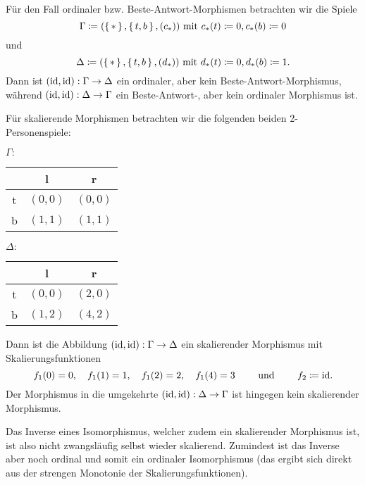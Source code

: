 \begin{bsp}
	Für den Fall ordinaler bzw. Beste-Antwort-Morphismen betrachten wir die Spiele 
		\[\Gamma \coloneqq (\set{\ast}, \set{t, b}, (c_\ast)) \text{ mit } c_\ast(t) \coloneqq 0, c_\ast(b) \coloneqq 0\]
	und 
		\[\Delta \coloneqq (\set{\ast}, \set{t, b}, (d_\ast)) \text{ mit } d_\ast(t) \coloneqq 0, d_\ast(b) \coloneqq 1.\]
	Dann ist $(\mathrm{id}, \mathrm{id}): \Gamma \to \Delta$ ein ordinaler, aber kein Beste-Antwort-Morphismus, während $(\mathrm{id}, \mathrm{id}): \Delta \to \Gamma$  ein Beste-Antwort-, aber kein ordinaler Morphismus ist.
\end{bsp}

\begin{bsp}\label{bsp:GegenbspSkalUndIsoIstSkalIso}
	Für skalierende Morphismen betrachten wir die folgenden beiden 2-Personenspiele:
	\begin{center}
		$\Gamma:$ \quad
		\begin{tabular}{c||c|c}
			& l 		& r 		\\\hline\hline
			t	& $(0,0)$	& $(0,0)$	\\\hline
			b	& $(1,1)$	& $(1,1)$ 
		\end{tabular}\hspace{5em}
		$\Delta:$ \quad
		\begin{tabular}{c||c|c}
			& l 		& r 		\\\hline\hline
			t	& $(0,0)$	& $(2,0)$	\\\hline
			b	& $(1,2)$	& $(4,2)$ 
		\end{tabular}
	\end{center}
	Dann ist die Abbildung $(\mathrm{id}, \mathrm{id}): \Gamma \to \Delta$ ein skalierender Morphismus mit Skalierungsfunktionen 
		\[f_1(0) = 0,\hspace{1em} f_1(1) = 1,\hspace{1em} f_1(2) = 2,\hspace{1em} f_1(4)=3 \qquad\text{ und }\qquad f_2 \coloneqq \mathrm{id}.\]
	Der Morphismus in die umgekehrte $(\mathrm{id}, \mathrm{id}): \Delta \to \Gamma$ ist hingegen kein skalierender Morphismus.
\end{bsp}

\begin{beob}\label{beob:InverseVonSkalMorphSindOrd}
	Das Inverse eines Isomorphismus, welcher zudem ein skalierender Morphismus ist, ist also nicht zwangsläufig selbst wieder skalierend. Zumindest ist das Inverse aber noch ordinal und somit ein ordinaler Isomorphismus (das ergibt sich direkt aus der strengen Monotonie der Skalierungsfunktionen).
\end{beob}

